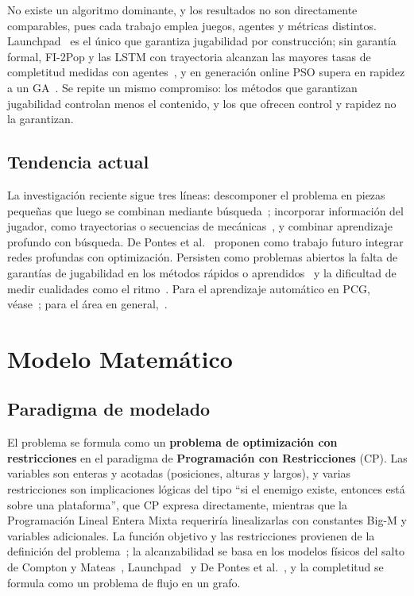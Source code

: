 \documentclass[letter, 10pt]{article}
\begin{document}
No existe un algoritmo dominante, y los resultados no son directamente comparables, pues cada trabajo emplea juegos, agentes y m\'etricas distintos. Launchpad~\cite{Smith2011} es el \'unico que garantiza jugabilidad por construcci\'on; sin garant\'ia formal, FI-2Pop y las LSTM con trayectoria alcanzan las mayores tasas de completitud medidas con agentes~\cite{Green2020,Summerville2016}, y en generaci\'on online PSO supera en rapidez a un GA~\cite{DePontes2022}. Se repite un mismo compromiso: los m\'etodos que garantizan jugabilidad controlan menos el contenido, y los que ofrecen control y rapidez no la garantizan.

\subsection{Tendencia actual}

La investigaci\'on reciente sigue tres l\'ineas: descomponer el problema en piezas peque\~nas que luego se combinan mediante b\'usqueda~\cite{Green2020,DePontes2022}; incorporar informaci\'on del jugador, como trayectorias o secuencias de mec\'anicas~\cite{Summerville2016, Green2020}, y combinar aprendizaje profundo con b\'usqueda. De Pontes et al.~\cite{DePontes2022} proponen como trabajo futuro integrar redes profundas con optimizaci\'on. Persisten como problemas abiertos la falta de garant\'ias de jugabilidad en los m\'etodos r\'apidos o aprendidos~\cite{DePontes2022, Summerville2016} y la dificultad de medir cualidades como el ritmo~\cite{Dahlskog2013}. Para el aprendizaje autom\'atico en PCG, v\'ease~\cite{Summerville2018}; para el \'area en general,~\cite{Shaker2016}.

\section{Modelo Matem\'atico}
\label{sec:modelo}

\subsection{Paradigma de modelado}

El problema se formula como un \textbf{problema de optimizaci\'on con restricciones} en el paradigma de \textbf{Programaci\'on con Restricciones} (CP). Las variables son enteras y acotadas (posiciones, alturas y largos), y varias restricciones son implicaciones l\'ogicas del tipo ``si el enemigo existe, entonces est\'a sobre una plataforma'', que CP expresa directamente, mientras que la Programaci\'on Lineal Entera Mixta requerir\'ia linealizarlas con constantes Big-M y variables adicionales. La funci\'on objetivo y las restricciones provienen de la definici\'on del problema~\cite{Saavedra2026}; la alcanzabilidad se basa en los modelos f\'isicos del salto de Compton y Mateas~\cite{Compton2006}, Launchpad~\cite{Smith2011} y De Pontes et al.~\cite{DePontes2022}, y la completitud se formula como un problema de flujo en un grafo.
\end{document}
